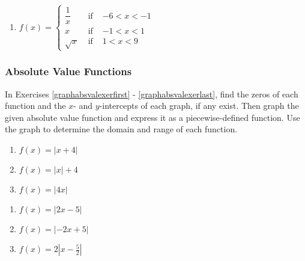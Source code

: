 \begin{center}
\begin{enumerate}
\setcounter{enumi}{\value{HW}}


\item ${\displaystyle f(x) = \left\{ \begin{array}{rcl} \dfrac{1}{x} & \mbox{ if } & -6 < x < -1\\
                                                                  x & \mbox{ if } & -1 < x < 1 \\
                                                           \sqrt{x} & \mbox{ if } & 1 < x < 9  
                                     \end{array} \right. }$ \label{sketchpiecelast}

\setcounter{HW}{\value{enumi}}
\end{enumerate}
\end{center}


\subsubsection{Absolute Value Functions}

In Exercises \ref{graphabsvalexerfirst} - \ref{graphabsvalexerlast}, find the zeros of each function and the $x$- and $y$-intercepts of each graph, if any exist.  Then graph the given absolute value function and express it as a piecewise-defined function.  Use the graph to determine the domain and range of each function.

\begin{multicols}{3}
\begin{enumerate}
\setcounter{enumi}{\value{HW}}

\item $f(x) = |x + 4|$ \label{graphabsvalexerfirst}
\item $f(x) = |x| + 4$
\item $f(x) = |4x|$


\setcounter{HW}{\value{enumi}}
\end{enumerate}
\end{multicols}

\begin{multicols}{3}
\begin{enumerate}
\setcounter{enumi}{\value{HW}}

\item $f(x) = |2x -5|$ 
\item $f(x) = |-2x+5|$
\item $f(x) = 2|x-\frac{5}{2}|$


\setcounter{HW}{\value{enumi}}
\end{enumerate}
\end{multicols}

